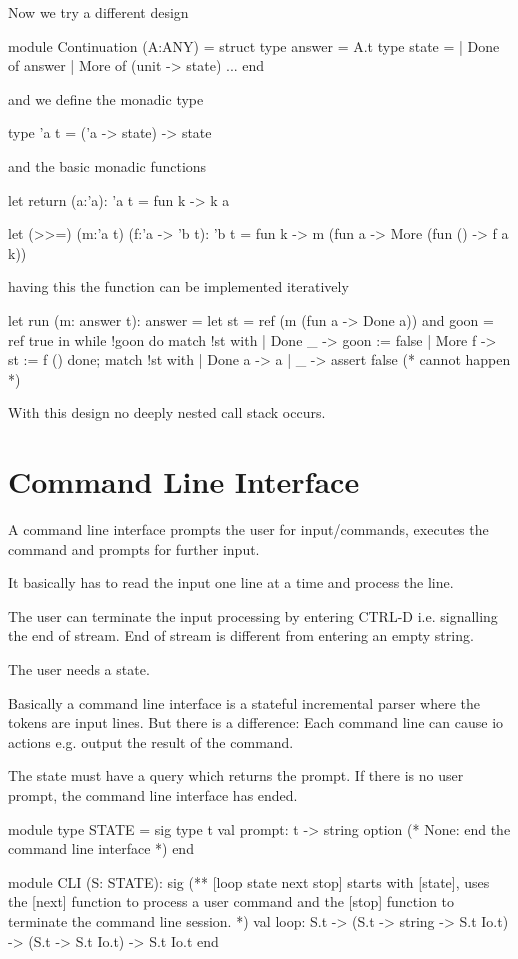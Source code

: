 Now we try a different design
%
\begin{ocaml}
  module Continuation (A:ANY) =
  struct
    type answer = A.t
    type state =
      | Done of answer
      | More of (unit -> state)
    ...
  end
\end{ocaml}
%
and we define the monadic type
\begin{ocaml}
  type 'a t = ('a -> state) -> state
\end{ocaml}
%
and the basic monadic functions
\begin{ocaml}
  let return (a:'a): 'a t =
    fun k -> k a

  let (>>=) (m:'a t) (f:'a -> 'b t): 'b t =
    fun k -> m (fun a -> More (fun () -> f a k))
\end{ocaml}
%
having this the function  can be implemented iteratively
\begin{ocaml}
  let run (m: answer t): answer =
    let st = ref (m (fun a -> Done a))
    and goon = ref true
    in
    while !goon do
      match !st with
      | Done _ ->
         goon := false
      | More f ->
         st := f ()
    done;
    match !st with
    | Done a ->
       a
    | _ ->
       assert false (* cannot happen *)
\end{ocaml}
%
With this design no deeply nested call stack occurs.




\section{Command Line Interface}

A command line interface prompts the user for input/commands, executes the
command and prompts for further input.

It basically has to read the input one line at a time and process the line.

The user can terminate the input processing by entering CTRL-D i.e. signalling
the end of stream. End of stream is different from entering an empty string.

The user needs a state.

Basically a command line interface is a stateful incremental parser where the
tokens are input lines. But there is a difference: Each command line can cause
io actions e.g. output the result of the command.

The state must have a query which returns the prompt. If there is no user
prompt, the command line interface has ended.

\begin{ocaml}
  module type STATE =
  sig
    type t
    val prompt: t -> string option (* None: end the command line interface *)
  end

  module CLI (S: STATE):
  sig
    (** [loop state next stop] starts with [state], uses the [next] function
        to process a user command and the [stop] function to terminate the
        command line session. *)
    val loop: S.t -> (S.t -> string -> S.t Io.t) -> (S.t -> S.t Io.t) -> S.t Io.t
  end
\end{ocaml}



